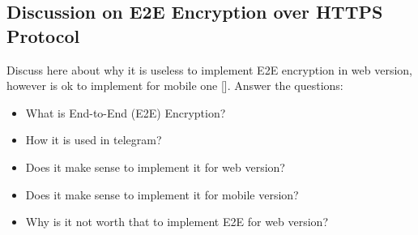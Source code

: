 \subsection{Discussion on E2E Encryption over HTTPS Protocol}\label{subsec:discussion-on-e2e-encryption-over-https-protocol}
Discuss here about why it is useless to implement E2E encryption in web version,
however is ok to implement for mobile one [\cite{JsMathRandom, E2eVsTLS}].
Answer the questions:
\begin{itemize}
    \item What is End-to-End (E2E) Encryption?
    \item How it is used in telegram?
    \item Does it make sense to implement it for web version?
    \item Does it make sense to implement it for mobile version?
    \item Why is it not worth that to implement E2E for web version?
\end{itemize}